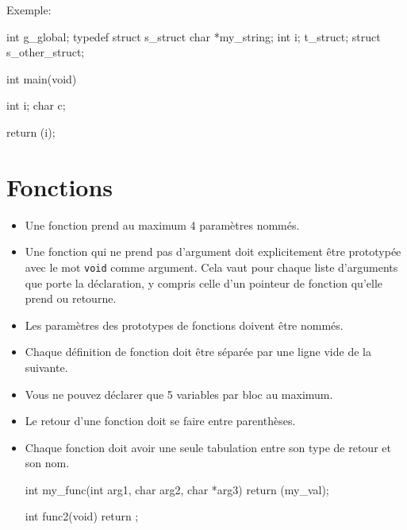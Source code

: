 \documentclass{42-fr}
\begin{document}
            \newpage

            Exemple:
            \begin{42ccode}
int             g_global;
typedef struct  s_struct
{
    char    *my_string;
    int     i;
}               t_struct;
struct          s_other_struct;

int     main(void)
{
    int     i;
    char    c;

    return (i);
}
            \end{42ccode}
            \newpage

    \section{Fonctions}

        \begin{itemize}

            \item Une fonction prend au maximum 4 paramètres nommés.

            \item Une fonction qui ne prend pas d’argument doit explicitement être prototypée 
                avec le mot \texttt{void} comme argument. Cela vaut pour chaque liste
                d’arguments que porte la déclaration, y compris celle d’un pointeur de
                fonction qu’elle prend ou retourne.

            \item Les paramètres des prototypes de fonctions doivent être nommés.

            \item Chaque définition de fonction doit être séparée par une ligne vide de la suivante.

            \item Vous ne pouvez déclarer que 5 variables par bloc au maximum.

            \item Le retour d’une fonction doit se faire entre parenthèses.

            \item Chaque fonction doit avoir une seule tabulation entre son type
                de retour et son nom.

            \begin{42ccode}
int my_func(int arg1, char arg2, char *arg3)
{
    return (my_val);
}

int func2(void)
{
    return ;
}
            \end{42ccode}

        \end{itemize}
        \newpage
\end{document}
